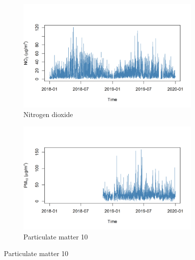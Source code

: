 \documentclass[a4paper, 10pt]{article}
\begin{document}
\begin{flushleft}
      \begin{figure}[H]
         \centering
         \begin{subfigure}{0.48\linewidth}
            \centering
            \includegraphics[width=\linewidth]{../img/raw_no2.png}
         \caption{Nitrogen dioxide}
         \end{subfigure}
         \hfill
         \begin{subfigure}{0.48\linewidth}
            \centering
            \includegraphics[width=\linewidth]{../img/raw_pm10.png}
            \caption{Particulate matter 10}
         \end{subfigure}
         
         \vspace{0.5em}


\end{figure}
\end{flushleft}
\end{document}
